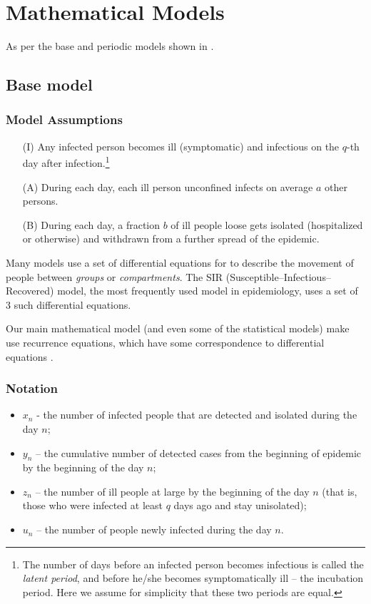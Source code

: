 \section{Mathematical Models}
\label{ch:mathmodel}

As per the base and periodic models shown in \cite{grigor20}.

\subsection{Base model}

\subsubsection{Model Assumptions}
\begin{itemize}
    \item[(I)] Any infected person becomes ill (symptomatic) and infectious on the $q$-th day after infection.\footnote{The number of days before an infected person becomes infectious is called the \textit{latent period}, and before he/she becomes symptomatically ill – the incubation period. Here we assume for simplicity that these two periods are equal.}
    \item[(A)] During each day, each ill person unconfined infects on average $a$ other persons.
    \item[(B)] During each day, a fraction $b$ of ill people loose gets isolated (hospitalized or otherwise) and withdrawn from a further spread of the epidemic.
\end{itemize}

Many models use a set of differential equations for to describe the movement of people between \textit{groups} or \textit{compartments}. The SIR (Susceptible–Infectious–Recovered) model, the most frequently used model in epidemiology, uses a set of 3 such differential equations. 

Our main mathematical model (and even some of the statistical models) make use recurrence equations, which have some correspondence to differential equations \cite{AGARWAL20021}.

\subsubsection{Notation}
\begin{itemize}
    \item $x_n$ - the number of infected people that are detected and isolated during the day $n$;
    \item $y_n$ – the cumulative number of detected cases from the beginning of epidemic by the beginning of the day $n$;
    \item $z_n$ – the number of ill people at large by the beginning of the day $n$ (that is, those who were infected at least $q$ days ago and stay unisolated);
    \item $u_n$ – the number of people newly infected during the day $n$.
\end{itemize}


